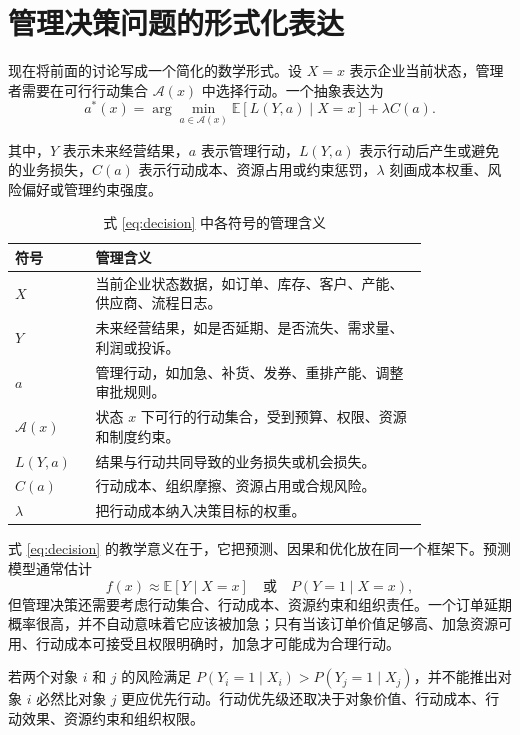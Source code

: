 \documentclass[UTF8,fontset=fandol,openany,zihao=-4]{ctexbook}
\begin{document}
\section{管理决策问题的形式化表达}

现在将前面的讨论写成一个简化的数学形式。设 \(X=x\) 表示企业当前状态，管理者需要在可行行动集合 \(\mathcal A(x)\) 中选择行动。一个抽象表达为
\begin{equation}
a^*(x)
=
\arg\min_{a\in\mathcal A(x)}
\mathbb E\!\left[L(Y,a)\mid X=x\right]
+
\lambda C(a).
\label{eq:decision}
\end{equation}

其中，\(Y\) 表示未来经营结果，\(a\) 表示管理行动，\(L(Y,a)\) 表示行动后产生或避免的业务损失，\(C(a)\) 表示行动成本、资源占用或约束惩罚，\(\lambda\) 刻画成本权重、风险偏好或管理约束强度。

\begin{table}[htbp]
\centering
\caption{式 \eqref{eq:decision} 中各符号的管理含义}
\begin{tabular}{p{0.14\linewidth}p{0.68\linewidth}}
\toprule
符号 & 管理含义\\
\midrule
\(X\) & 当前企业状态数据，如订单、库存、客户、产能、供应商、流程日志。\\
\(Y\) & 未来经营结果，如是否延期、是否流失、需求量、利润或投诉。\\
\(a\) & 管理行动，如加急、补货、发券、重排产能、调整审批规则。\\
\(\mathcal A(x)\) & 状态 \(x\) 下可行的行动集合，受到预算、权限、资源和制度约束。\\
\(L(Y,a)\) & 结果与行动共同导致的业务损失或机会损失。\\
\(C(a)\) & 行动成本、组织摩擦、资源占用或合规风险。\\
\(\lambda\) & 把行动成本纳入决策目标的权重。\\
\bottomrule
\end{tabular}
\end{table}

式 \eqref{eq:decision} 的教学意义在于，它把预测、因果和优化放在同一个框架下。预测模型通常估计
\[
f(x)\approx \mathbb E[Y\mid X=x]
\quad\text{或}\quad
P(Y=1\mid X=x),
\]
但管理决策还需要考虑行动集合、行动成本、资源约束和组织责任。一个订单延期概率很高，并不自动意味着它应该被加急；只有当该订单价值足够高、加急资源可用、行动成本可接受且权限明确时，加急才可能成为合理行动。

\begin{proposition}[预测分数不等于行动优先级]
若两个对象 \(i\) 和 \(j\) 的风险满足 \(P(Y_i=1\mid X_i)>P(Y_j=1\mid X_j)\)，并不能推出对象 \(i\) 必然比对象 \(j\) 更应优先行动。行动优先级还取决于对象价值、行动成本、行动效果、资源约束和组织权限。
\end{proposition}
\end{document}
